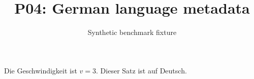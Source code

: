 \documentclass{article}
\title{P04: German language metadata}
\author{Synthetic benchmark fixture}
\date{}
\begin{document}
\maketitle
Die Geschwindigkeit ist \(v=3\). Dieser Satz ist auf Deutsch.
\end{document}
